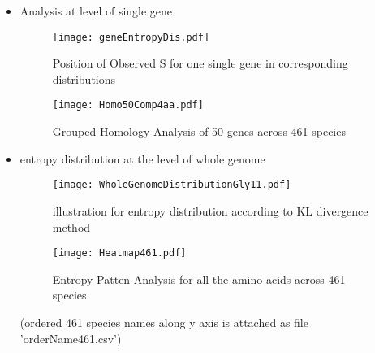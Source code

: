\documentclass[conference]{IEEEtran}
\begin{document}
\begin{itemize}

\item{Analysis at level of single gene}
\begin{figure}[h]
\texttt{[image: geneEntropyDis.pdf]}
\caption{Position of Observed S for one single gene in corresponding distributions}
\end{figure}

\begin{figure}[h]
\texttt{[image: Homo50Comp4aa.pdf]}
\caption{Grouped Homology Analysis of 50 genes across 461 species}
\end{figure}

\item{entropy distribution at the level of whole genome }
\begin{figure}[h]
\texttt{[image: WholeGenomeDistributionGly11.pdf]}
\caption{illustration for entropy distribution according to KL divergence method}
\end{figure}


\begin{figure}[h]
\texttt{[image: Heatmap461.pdf]}
\caption{Entropy Patten Analysis for all the amino acids across 461 species}
\end{figure}
(ordered 461 species names along y axis is attached as file 'orderName461.csv')



\end{itemize}
\end{document}
